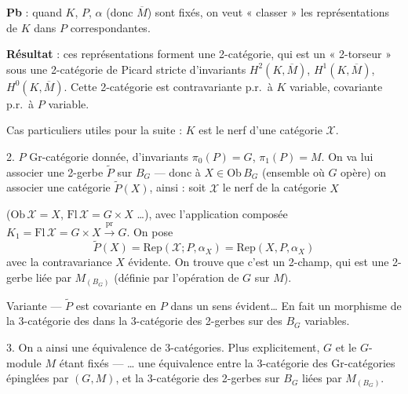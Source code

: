 \documentclass[11pt,a4paper]{article}
\begin{document}
\textbf{Pb} : quand $K$, $P$, $\alpha$ (donc $\overline{M}$) sont fixés, on
veut « classer » les représentations de $K$ dans $P$ correspondantes.

\textbf{Résultat} : ces représentations forment une 2-catégorie, qui est un
« 2-torseur » sous une 2-catégorie de Picard stricte d'invariants
$H^2(K, \overline{M})$, $H^1(K, \overline{M})$, $H^0(K, \overline{M})$.
Cette 2-catégorie est contravariante p.r.\ à $K$ variable, covariante
p.r.\ à $P$ variable.

Cas particuliers utiles pour la suite : $K$ est le nerf d'une catégorie
$\mathcal{X}$.


2. $P$ Gr-catégorie donnée, d'invariants $\pi_0(P) = G$, $\pi_1(P) = M$. On
va lui associer une 2-gerbe $\widetilde{P}$ sur $B_G$ — donc à
 $X \in \mathrm{Ob}\,B_G$ (ensemble où $G$ opère) on
 associer une catégorie $\widetilde{P}(X)$, ainsi : soit
$\mathcal{X}$ le nerf de la catégorie  $X$

($\mathrm{Ob}\,\mathcal{X} = X$, $\mathrm{Fl}\,\mathcal{X} = G \times X$
\ldots), avec l'application composée $K_1 = \mathrm{Fl}\,\mathcal{X} =
G \times X \xrightarrow{\ \mathrm{pr}\ } G$. On pose
\[
\widetilde{P}(X) = \mathrm{Rep}(\mathcal{X} ; P, \alpha_X)
= \mathrm{Rep}(X, P, \alpha_X)
\]
avec la contravariance  $X$ évidente. On trouve que
c'est un 2-champ, qui est une 2-gerbe liée par $M_{(B_G)}$ (définie par
l'opération de $G$ sur $M$). 

Variante — $\widetilde{P}$ est covariante en $P$ dans un sens évident\ldots{}
En fait  un morphisme de la 3-catégorie des \ill{}
dans la 3-catégorie des 2-gerbes sur des $B_G$ variables.

3. On a ainsi une équivalence de 3-catégories. Plus explicitement, $G$ et
le $G$-module $M$ étant fixés — \ldots{} une équivalence entre la
3-catégorie des Gr-catégories  épinglées par $(G,M)$,
et la 3-catégorie des 2-gerbes sur $B_G$ liées par $M_{(B_G)}$.
\end{document}
